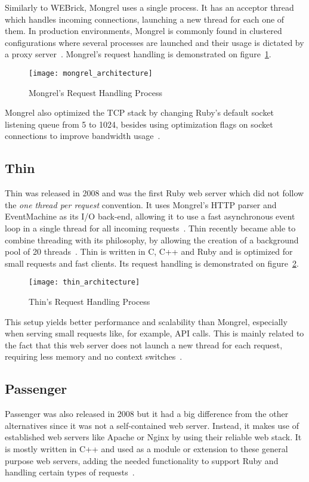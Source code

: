 Similarly to WEBrick, Mongrel uses a single process. It has an acceptor thread which handles incoming connections, launching a new thread for each one of them. In production environments, Mongrel is commonly found in clustered configurations where several processes are launched and their usage is dictated by a proxy server~\cite{mongrel_faq}. Mongrel's request handling is demonstrated on figure~\ref{fig:mongrel_architecture}.
\begin{figure}[h!t]
  \centering
    \texttt{[image: mongrel\_architecture]}
    \caption{Mongrel's Request Handling Process} \label{fig:mongrel_architecture}
\end{figure}
Mongrel also optimized the TCP stack by changing Ruby's default socket listening queue from 5 to 1024, besides using optimization flags on socket connections to improve bandwidth usage~\cite{mongrel_faq}.


\subsection{Thin}
Thin was released in 2008 and was the first Ruby web server which did not follow the \textit{one thread per request} convention. It uses Mongrel's HTTP parser and EventMachine as its I/O back-end, allowing it to use a fast asynchronous event loop in a single thread for all incoming requests~\cite{thin}. Thin recently became able to combine threading with its philosophy, by allowing the creation of a background pool of 20 threads~\cite{ruby_webservers}. Thin is written in C, C++ and Ruby and is optimized for small requests and fast clients. Its request handling is demonstrated on figure~\ref{fig:thin_architecture}.
\begin{figure}[h!t]
  \centering
    \texttt{[image: thin\_architecture]}
    \caption{Thin's Request Handling Process} \label{fig:thin_architecture}
\end{figure}
This setup yields better performance and scalability than Mongrel, especially when serving small requests like, for example, API calls. This is mainly related to the fact that this web server does not launch a new thread for each request, requiring less memory and no context switches~\cite{ruby_webservers}.
 

\subsection{Passenger}
Passenger was also released in 2008 but it had a big difference from the other alternatives since it was not a self-contained web server. Instead, it makes use of established web servers like Apache or Nginx by using their reliable web stack. It is mostly written in C++ and used as a module or extension to these general purpose web servers, adding the needed functionality to support Ruby and handling certain types of requests~\cite{passenger_whatis}.

